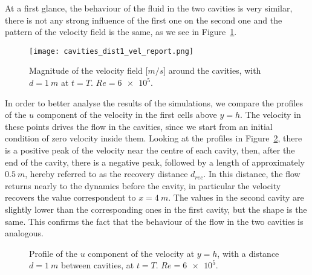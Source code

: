 At a first glance, the behaviour of the fluid in the two cavities is very 
similar, there is not any strong influence of the first one on the second one 
and the pattern of the velocity field is the same, as we see in Figure~\ref{fig:veld1}. 
\begin{figure}
	\centering
	\texttt{[image: cavities\_dist1\_vel\_report.png]}
	\caption[Magnitude of the velocity field in the cavities problem]{Magnitude of the velocity field [$\si{m/s}$] around the cavities, with $d=\SI{1}{m}$ at $t=T$. $Re=\num{6e5}$.}
	\label{fig:veld1}
\end{figure}
In order to better analyse the results of the simulations, we compare the 
profiles of the $u$ component of the velocity in the first cells above $y=h$. The velocity in these points drives the flow in the cavities, 
since we start from an initial condition of zero velocity inside them.
Looking at the profiles in Figure~\ref{fig:velprofile1}, there is a positive 
peak of the velocity near the centre of each cavity, then, after the end of the cavity, there is a negative peak, followed by a
length of approximately $\SI{0.5}{m}$, hereby referred to as the recovery distance $d_{rec}$.
In this distance, the flow returns nearly to the dynamics before the cavity, in particular the velocity recovers the value correspondent to $x=\SI{4}{m}$.
The values in the second 
cavity are slightly lower than the corresponding ones in the first cavity, but 
the shape is the same. This confirms the fact that the behaviour of the flow 
in the two cavities is analogous.
\begin{figure}
	\centering
	
	\caption[Profile of the $u$ component of the velocity at $y=h$ in the cavities problem]{Profile of the $u$ component of the velocity at $y=h$, with a distance $d=\SI{1}{m}$ between cavities, at $t=T$. $Re = \num{6e5}$.}
	\label{fig:velprofile1}
\end{figure}

